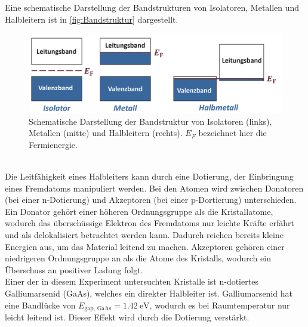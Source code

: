 Eine schematische Darstellung der Bandstrukturen von Isolatoren, Metallen und Halbleitern ist in \autoref{fig:Bandstruktur} dargestellt.
\begin{figure}
    \centering
    \includegraphics[width = \textwidth]{content/V46_pictures/Bandluecke.png}
    \caption{Schematische Darstellung der Bandstruktur von Isolatoren (links), Metallen (mitte) und Halbleitern (rechts). $E_F$ bezeichnet hier die Fermienergie. \cite{grossmarx}}
    \label{fig:Bandstruktur}
\end{figure}
\\Die Leitfähigkeit eines Halbleiters kann durch eine Dotierung, der Einbringung eines Fremdatoms manipuliert werden. Bei den Atomen wird zwischen Donatoren (bei einer n-Dotierung) und
Akzeptoren (bei einer p-Dortierung) unterschieden.\\
Ein Donator gehört einer höheren Ordnungsgruppe als die Kristallatome, wodurch das überschüssige Elektron des Fremdatoms nur leichte Kräfte 
erfährt und als delokalisiert betrachtet werden kann. Dadurch reichen bereits kleine Energien aus, um das Material leitend zu machen.
Akzeptoren gehören einer niedrigeren Ordnungsgruppe an als die Atome des Kristalls, wodurch ein Überschuss an positiver Ladung folgt.\\
Einer der in diesem Experiment untersuchten Kristalle ist n-dotiertes Galliumarsenid (GaAs), welches ein direkter Halbleiter ist. Galliumarsenid hat eine Bandlücke von $E_{\text{gap, GaAs}} = \qty{1,42}{\electronvolt}$,
wodurch es bei Raumtemperatur nur leicht leitend ist. Dieser Effekt wird durch die Dotierung verstärkt.

